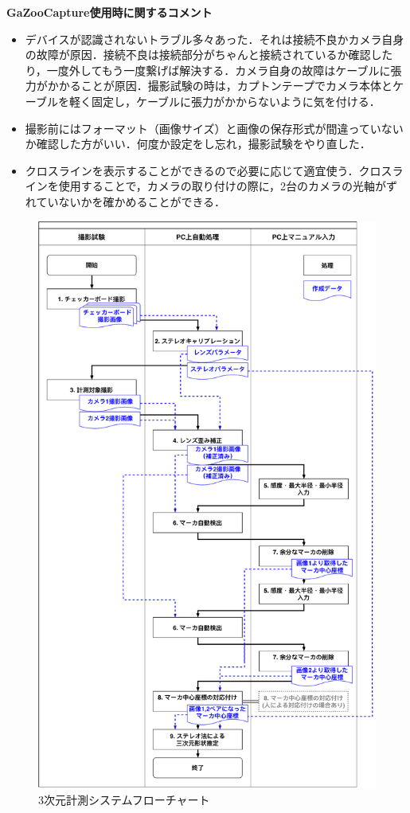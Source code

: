 \textbf{GaZooCapture使用時に関するコメント}
\begin{itemize}
	\item デバイスが認識されないトラブル多々あった．それは接続不良かカメラ自身の故障が原因．接続不良は接続部分がちゃんと接続されているか確認したり，一度外してもう一度繋げば解決する．カメラ自身の故障はケーブルに張力がかかることが原因．撮影試験の時は，カプトンテープでカメラ本体とケーブルを軽く固定し，ケーブルに張力がかからないように気を付ける．
	
	\item 撮影前にはフォーマット（画像サイズ）と画像の保存形式が間違っていないか確認した方がいい．何度か設定をし忘れ，撮影試験をやり直した．
	
	\item クロスラインを表示することができるので必要に応じて適宜使う．クロスラインを使用することで，カメラの取り付けの際に，2台のカメラの光軸がずれていないかを確かめることができる．
\end{itemize}

\begin{figure}[H]
	\centering
	\includegraphics[width=123mm]{03/fig/3-9-2-2-1.pdf}
	\caption{3次元計測システムフローチャート}
	\label{fig3-9-2-2-1}
\end{figure}

